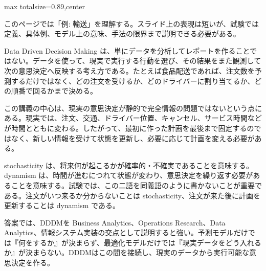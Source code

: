 \begin{minipage}[t]{0.58\textwidth}
\begin{adjustbox}{max totalsize={\textwidth}{0.89\textheight},center}
\begin{minipage}{\textwidth}\scriptsize
{}このページでは「例: 輸送」を理解する。スライド上の表現は短いが、試験では定義、具体例、モデル上の意味、手法の限界まで説明できる必要がある。\par
Data Driven Decision Making は、単にデータを分析してレポートを作ることではない。データを使って、現実で実行する行動を選び、その結果をまた観測して次の意思決定へ反映する考え方である。たとえば食品配送であれば、注文数を予測するだけではなく、どの注文を受けるか、どのドライバーに割り当てるか、どの順番で回るかまで決める。\par
この講義の中心は、現実の意思決定が静的で完全情報の問題ではないという点にある。現実では、注文、交通、ドライバー位置、キャンセル、サービス時間などが時間とともに変わる。したがって、最初に作った計画を最後まで固定するのではなく、新しい情報を受けて状態を更新し、必要に応じて計画を変える必要がある。\par
stochasticity は、将来何が起こるかが確率的・不確実であることを意味する。dynamism は、時間が進むにつれて状態が変わり、意思決定を繰り返す必要があることを意味する。試験では、この二語を同義語のように書かないことが重要である。注文がいつ来るか分からないことは stochasticity、注文が来た後に計画を更新することは dynamism である。\par
答案では、DDDMを Business Analytics、Operations Research、Data Analytics、情報システム実装の交点として説明すると強い。予測モデルだけでは『何をするか』が決まらず、最適化モデルだけでは『現実データをどう入れるか』が決まらない。DDDMはこの間を接続し、現実のデータから実行可能な意思決定を作る。\par

\end{minipage}
\end{adjustbox}
\end{minipage}
